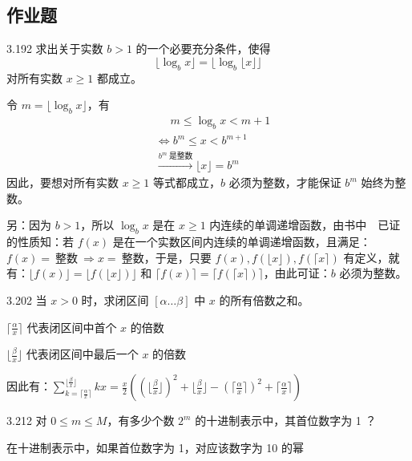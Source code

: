 \subsection{作业题}

\begin{problem}{3.19}{2}
  求出关于实数 \( b > 1 \) 的一个必要充分条件，使得
  \[
    \lfloor \log_b{x} \rfloor = \lfloor \log_b{\lfloor x \rfloor} \rfloor
  \]
  对所有实数 \( x \ge 1 \) 都成立。
\end{problem}

令 \( m = \lfloor \log_b{x} \rfloor \)，有
\begin{align*}
  &\phantom{=} m \le \log_b{x} < m+1 \\
  &\Leftrightarrow b^m \le x < b^{m+1} \\
  &\xrightarrow{b^m \ \text{是整数}} \lfloor x \rfloor = b^m
\end{align*}
因此，要想对所有实数 \( x \ge 1 \) 等式都成立，\( b \) 必须为整数，才能保证 \( b^m \) 始终为整数。

另：因为 \( b > 1 \)，所以 \( \log_b{x} \) 是在 \( x \ge 1 \) 内连续的单调递增函数，由书中~\cite{graham1994concrete}~已证的性质知：若 \( f(x) \) 是在一个实数区间内连续的单调递增函数，且满足：\( f(x) = \ \text{整数} \ \Rightarrow x = \ \text{整数} \)，于是，只要 \( f(x), f(\lfloor x \rfloor), f(\lceil x \rceil) \) 有定义，就有：\( \lfloor f(x) \rfloor = \lfloor f( \lfloor x \rfloor) \rfloor \) 和 \( \lceil f(x) \rceil = \lceil f(\lceil x \rceil) \rceil \)，由此可证：\( b \) 必须为整数。

\begin{problem}{3.20}{2}
  当 \( x>0 \) 时，求闭区间 \( [\alpha \dots \beta] \) 中 \( x \) 的所有倍数之和。
\end{problem}

\( \lceil \frac{\alpha}{x} \rceil \) 代表闭区间中首个 \( x \) 的倍数

\( \lfloor \frac{\beta}{x} \rfloor \) 代表闭区间中最后一个 \( x \) 的倍数

因此有：\( \sum_{k=\lceil \frac{\alpha}{x} \rceil}^{\lfloor \frac{\beta}{x} \rfloor} kx = \frac{x}{2} ((\lfloor \frac{\beta}{x} \rfloor)^2 + \lfloor \frac{\beta}{x} \rfloor -(\lceil \frac{\alpha}{x} \rceil)^2 + \lceil \frac{\alpha}{x} \rceil) \)

\begin{problem}{3.21}{2}
  对 \( 0 \le m \le M \)，有多少个数 \( 2^m \) 的十进制表示中，其首位数字为 1 ？
\end{problem}

在十进制表示中，如果首位数字为 1，对应该数字为 10 的幂

